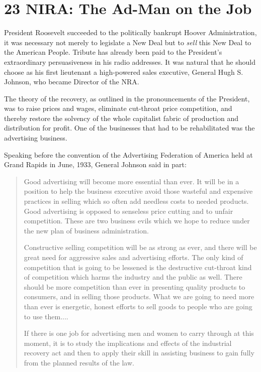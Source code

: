 \documentclass[nohyper,openany,nobib]{tufte-book}
\let\oldchapter\chapter
\def\chapter{%
  \setcounter{footnote}{0}%
  \oldchapter
}
\begin{document}
\chapter[23 \hspace*{1mm} NIRA: The Ad-Man on the Job]{23 NIRA: The Ad-Man on the Job}

 President Roosevelt succeeded to the politically bankrupt Hoover
Administration, it was necessary not merely to legislate a New Deal but
to \emph{sell} this New Deal to the American People. Tribute has already
been paid to the President's extraordinary persuasiveness in his radio
addresses. It was natural that he should choose as his first lieutenant
a high-powered sales executive, General Hugh S. Johnson, who became
Director of the NRA.

The theory of the recovery, as outlined in the pronouncements of the
President, was to raise prices and wages, eliminate cut-throat price
competition, and thereby restore the solvency of the whole capitalist
fabric of production and distribution for profit. One of the businesses
that had to be rehabilitated was the advertising business.

Speaking before the convention of the Advertising Federation of America
held at Grand Rapids in June, 1933, General Johnson said in part:

\begin{quote}
Good advertising will become more essential than ever. It will be in a
position to help the business executive avoid those wasteful and
expensive practices in selling which so often add needless costs to
needed products. Good advertising is opposed to senseless price cutting
and to unfair competition. These are two business evils which we hope to
reduce under the new plan of business administration.

Constructive selling competition will be as strong as ever, and there
will be great need for aggressive sales and advertising efforts. The
only kind of competition that is going to be lessened is the destructive
cut-throat kind of competition which harms the industry and the public
as well. There should be more competition than ever in presenting
quality products to consumers, and in selling those products. What we
are going to need more than ever is energetic, honest efforts to sell
goods to people who are going to use them....

If there is one job for advertising men and women to carry through at
this moment, it is to study the implications and effects of the
industrial recovery act and then to apply their skill in assisting
business to gain fully from the planned results of the law.
\end{quote}
\end{document}
